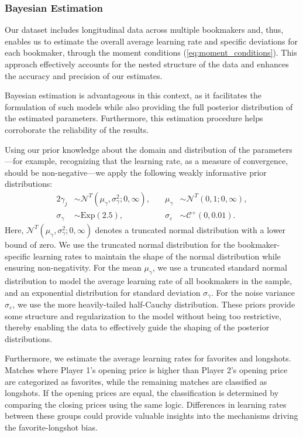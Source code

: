 \documentclass[webpdf,modern,medium]{oup-authoring-template}
\theoremstyle{thmstyleone}%
\theoremstyle{thmstyletwo}%
\theoremstyle{thmstylethree}%
\begin{document}
\subsubsection{Bayesian Estimation}

     Our dataset includes longitudinal data across multiple bookmakers and, thus, enables us to estimate the overall average learning rate and specific deviations for each bookmaker, through the moment conditions (\ref{eq:moment_conditions}). This approach effectively accounts for the nested structure of the data and enhances the accuracy and precision of our estimates.

    Bayesian estimation is advantageous in this context, as it facilitates the formulation of such models while also providing the full posterior distribution of the estimated parameters. Furthermore, this estimation procedure helps corroborate the reliability of the results.

    Using our prior knowledge about the domain and distribution of the parameters---for example, recognizing that the learning rate, as a measure of convergence, should be non-negative---we apply the following weakly informative prior distributions:
    \begin{alignat*}{2}
            \gamma_j &\sim \mathcal{N}^T\left(\mu_{\gamma}, \sigma_{\gamma}^2; 0, \infty \right),\quad &
            \mu_{\gamma}& \sim \mathcal{N}^T\left(0, 1; 0, \infty \right), \\
            \sigma_{\gamma} &\sim \mathrm{Exp}\left(2.5 \right), &
            \sigma_{\varepsilon} &\sim \mathcal{C}^+\left(0, 0.01 \right).
    \end{alignat*}
    Here, $\mathcal{N}^T\left(\mu_{\gamma}, \sigma_{\gamma}^2; 0, \infty \right)$ denotes a truncated normal distribution with a lower bound of zero. We use the truncated normal distribution for the bookmaker-specific learning rates to maintain the shape of the normal distribution while ensuring non-negativity. For the mean $\mu_{\gamma}$, we use a truncated standard normal distribution to model the average learning rate of all bookmakers in the sample, and an exponential distribution for standard deviation $\sigma_{\gamma}$. For the noise variance $\sigma_{\varepsilon}$, we use the more heavily-tailed half-Cauchy distribution.
    These priors provide some structure and regularization to the model without being too restrictive, thereby enabling the data to effectively guide the shaping of the posterior distributions.

    Furthermore, we estimate the average learning rates for favorites and longshots. Matches where Player 1's opening price is higher than Player 2's opening price are categorized as favorites, while the remaining matches are classified as longshots. If the opening prices are equal, the classification is determined by comparing the closing prices using the same logic. Differences in learning rates between these groups could provide valuable insights into the mechanisms driving the favorite-longshot bias.
\end{document}

